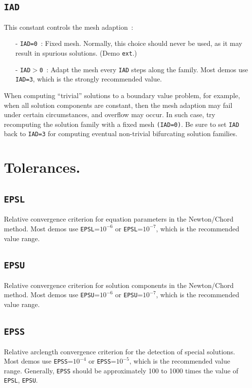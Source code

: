 \documentclass[12pt]{report}
\begin{document}
\subsection{\tt IAD} \label{sec:IAD}
This constant controls the mesh adaption~: 
\begin{itemize}
\item[-] {\tt IAD=0}~:
  Fixed mesh. Normally, this choice should never be used, as it may result
  in spurious solutions. (Demo {\tt ext}.)
\item[-] {\tt IAD$>$0}~:  
  Adapt the mesh every {\tt IAD} steps along the family.
  Most demos use {\tt IAD=3}, which is the strongly recommended value.
\end{itemize}

When computing  ``trivial'' solutions to a boundary value problem,
for example, when all solution components are constant, then the
mesh adaption may fail under certain circumstances, and overflow may
occur. In such case, try recomputing the solution family with a fixed
mesh {\tt (IAD=0)}. Be sure to set  {\tt IAD} back to {\tt IAD=3} 
for computing eventual non-trivial bifurcating solution families.
\section{ Tolerances.} \label{sec:Tolerances}
\subsection{\tt EPSL}  \label{sec:EPSL}
 Relative convergence criterion for equation parameters in the Newton/Chord 
 method. Most demos use {\tt EPSL}=$10^{-6}$ or {\tt EPSL}=$10^{-7}$,
 which is the recommended value range.

\subsection{\tt EPSU}  \label{sec:EPSU}
 Relative convergence criterion for solution components in the Newton/Chord 
 method. Most demos use {\tt EPSU}=$10^{-6}$ or {\tt EPSU}=$10^{-7}$,
 which is the recommended value range.

\subsection{\tt EPSS}  \label{sec:EPSS}
 Relative arclength convergence criterion for the detection of special solutions. 
 Most demos use {\tt EPSS}=$10^{-4}$ or  {\tt EPSS}=$10^{-5}$,
 which is the recommended value range.
 Generally, {\tt EPSS} should be approximately 100 to 1000 times the value
 of {\tt EPSL}, {\tt EPSU}.
 
\end{document}
